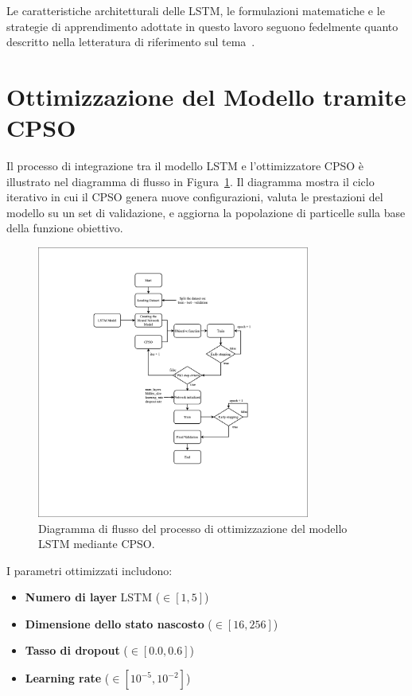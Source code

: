 \documentclass{article}
\begin{document}
\bigskip

Le caratteristiche architetturali delle LSTM, le formulazioni matematiche e le strategie di apprendimento 
adottate in questo lavoro seguono fedelmente quanto descritto nella letteratura di riferimento sul 
tema~\cite{hochreiter1997long, graves2013speech, greff2017lstm}.


\section{Ottimizzazione del Modello tramite CPSO}

Il processo di integrazione tra il modello LSTM e l’ottimizzatore CPSO è illustrato nel diagramma di 
flusso in Figura~\ref{fig:cpso_flowchart}. Il diagramma mostra il ciclo iterativo in cui il CPSO genera 
nuove configurazioni, valuta le prestazioni del modello su un set di validazione, e aggiorna la 
popolazione di particelle sulla base della funzione obiettivo.

\begin{figure}[H]
    \centering
    \includegraphics[width=0.8\textwidth]{img/LSTM-CPSO-MODEL.png}
    \caption{Diagramma di flusso del processo di ottimizzazione del modello LSTM mediante CPSO.}
    \label{fig:cpso_flowchart}
\end{figure}

I parametri ottimizzati includono:
\begin{itemize}
    \item \textbf{Numero di layer} LSTM ($\in [1, 5]$)
    \item \textbf{Dimensione dello stato nascosto} ($\in [16, 256]$)
    \item \textbf{Tasso di dropout} ($\in [0.0, 0.6]$)
    \item \textbf{Learning rate} ($\in [10^{-5}, 10^{-2}]$)
\end{itemize}
\end{document}
